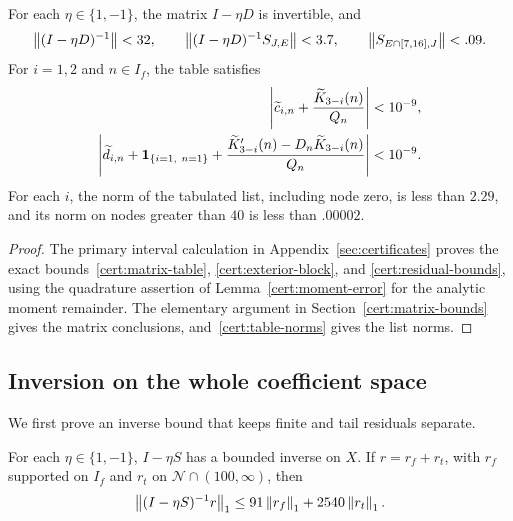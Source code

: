 \begin{lemma}\label{interpolation:finite}
For each $\eta\in\{1,-1\}$, the matrix $I-\eta D$ is invertible, and
\begin{equation}\label{interpolation:finite-matrices}
 \left\lVert(I-\eta D)^{-1}\right\rVert<32,\qquad
 \left\lVert(I-\eta D)^{-1}S_{J,E}\right\rVert<3.7,\qquad
 \left\lVert S_{E\cap[7,16],J}\right\rVert<.09.
\end{equation}
For $i=1,2$ and $n\in I_f$, the table satisfies
\begin{equation}\label{interpolation:finite-residuals}
 \begin{split}
 \left\lvert\widetilde c_{i,n}+\frac{\widetilde K_{3-i}(n)}{Q_n}\right\rvert
 &<10^{-9},\\
 \left\lvert\widetilde d_{i,n}+\mathbf1_{\{i=1,\ n=1\}}
       +\frac{\widetilde K_{3-i}'(n)-D_n\widetilde K_{3-i}(n)}{Q_n}\right\rvert
 &<10^{-9}.
 \end{split}
\end{equation}
For each $i$, the norm of the tabulated list, including node zero, is less
than $2.29$, and its norm on nodes greater than $40$ is less than $.00002$.
\end{lemma}

\begin{proof}
The primary interval calculation in Appendix~\ref{sec:certificates} proves
the exact bounds~\eqref{cert:matrix-table}, \eqref{cert:exterior-block}, and
\eqref{cert:residual-bounds}, using the quadrature assertion of
Lemma~\ref{cert:moment-error} for the analytic moment remainder.
The elementary argument in Section~\ref{cert:matrix-bounds} gives the
matrix conclusions, and~\eqref{cert:table-norms} gives the list norms.
\end{proof}

\subsection{Inversion on the whole coefficient space}

We first prove an inverse bound that keeps finite and tail residuals
separate.

\begin{lemma}\label{interpolation:inverse}
For each $\eta\in\{1,-1\}$, $I-\eta S$ has a bounded inverse on $X$.
If $r=r_f+r_t$, with $r_f$ supported on $I_f$ and $r_t$ on
$\mathcal N\cap(100,\infty)$, then
\begin{equation}\label{interpolation:inverse-bound}
 \left\lVert(I-\eta S)^{-1}r\right\rVert_1
 \le91\left\lVert r_f\right\rVert_1+2540\left\lVert r_t\right\rVert_1.
\end{equation}
\end{lemma}

